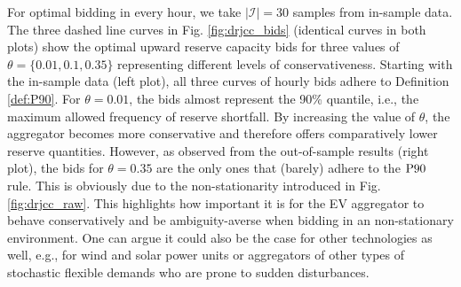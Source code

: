 \documentclass[conference]{IEEEtran}
\begin{document}
For optimal bidding in every hour, we take $|\mathcal{I}| = 30$ samples from  in-sample data. The three dashed line curves in Fig. \ref{fig:drjcc_bids} (identical curves in both plots) show the optimal upward reserve capacity bids for  three values of $\theta = \{0.01, 0.1, 0.35\}$ representing different levels of conservativeness. 
Starting with the in-sample data (left plot), all three curves of hourly bids adhere to Definition \ref{def:P90}. For $\theta = 0.01$, the bids almost represent the 90\% quantile, i.e., the maximum allowed frequency of reserve shortfall. By increasing the value of $\theta$, the aggregator becomes more conservative and therefore offers comparatively lower reserve quantities. However, as observed from the out-of-sample results (right plot), the bids for $\theta = 0.35$ are the only ones that (barely) adhere to the $\rm{P90}$ rule. This is obviously due to the non-stationarity introduced in Fig. \ref{fig:drjcc_raw}. This highlights how important it is for the EV aggregator to behave conservatively and be ambiguity-averse when bidding in an non-stationary environment. One can argue it could also be the case  
for other technologies as well, e.g., for wind and solar power units or aggregators of other types of stochastic flexible demands who are prone to sudden disturbances. 

\end{document}
